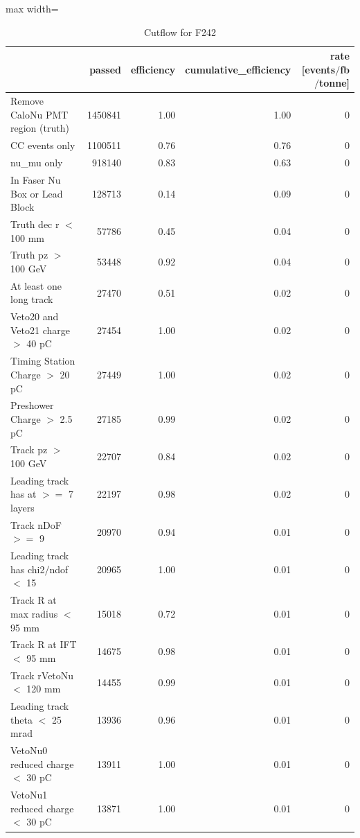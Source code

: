 \documentclass{article}
\begin{document}
\begin{table}
\centering
\caption{Cutflow for F242}
\begin{adjustbox}{max width=\textwidth}
\begin{tabular}{lrrrr}
\toprule
 & passed & efficiency & cumulative\_efficiency & rate [events$/$fb$/$tonne] \\
\midrule
Remove CaloNu PMT region (truth) & 1450841 & 1.00 & 1.00 & 0 \\
CC events only & 1100511 & 0.76 & 0.76 & 0 \\
nu\_mu only & 918140 & 0.83 & 0.63 & 0 \\
In Faser Nu Box or Lead Block & 128713 & 0.14 & 0.09 & 0 \\
Truth dec r $<$ 100 mm & 57786 & 0.45 & 0.04 & 0 \\
Truth pz $>$ 100 GeV & 53448 & 0.92 & 0.04 & 0 \\
At least one long track & 27470 & 0.51 & 0.02 & 0 \\
Veto20 and Veto21 charge $>$ 40 pC & 27454 & 1.00 & 0.02 & 0 \\
Timing Station Charge $>$ 20 pC & 27449 & 1.00 & 0.02 & 0 \\
Preshower Charge $>$ 2.5 pC & 27185 & 0.99 & 0.02 & 0 \\
Track pz $>$ 100 GeV & 22707 & 0.84 & 0.02 & 0 \\
Leading track has at $>$$=$ 7 layers & 22197 & 0.98 & 0.02 & 0 \\
Track nDoF $>$$=$ 9 & 20970 & 0.94 & 0.01 & 0 \\
Leading track has chi2$/$ndof $<$ 15 & 20965 & 1.00 & 0.01 & 0 \\
Track R at max radius $<$ 95 mm & 15018 & 0.72 & 0.01 & 0 \\
Track R at IFT $<$ 95 mm & 14675 & 0.98 & 0.01 & 0 \\
Track rVetoNu $<$ 120 mm & 14455 & 0.99 & 0.01 & 0 \\
Leading track theta $<$ 25 mrad & 13936 & 0.96 & 0.01 & 0 \\
VetoNu0 reduced charge $<$ 30 pC & 13911 & 1.00 & 0.01 & 0 \\
VetoNu1 reduced charge $<$ 30 pC & 13871 & 1.00 & 0.01 & 0 \\
\bottomrule
\end{tabular}

\end{adjustbox}
\end{table}
\end{document}
